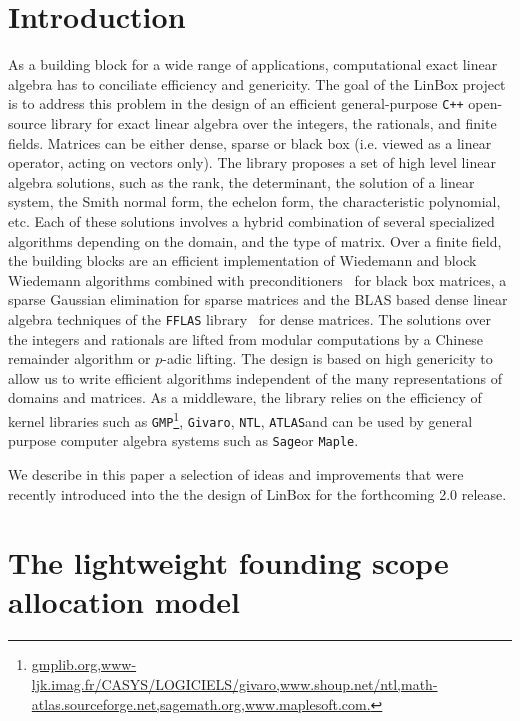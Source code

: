 \documentclass{article}
\newcommand{\linbox}{{\sc LinBox}\xspace}
\begin{document}
\section{Introduction}
As a building block for a wide range of applications, computational
exact linear algebra has to conciliate efficiency and genericity. The
goal of the \linbox project is to address this problem in the design
of an efficient general-purpose \texttt{C++} open-source library for
exact linear algebra over the integers, the rationals, and finite
fields.
Matrices can be either dense, sparse or black box (i.e. viewed as a linear
operator, acting on vectors only). The library proposes a set of high level
linear algebra solutions, such as the rank, the determinant, the solution of a
linear system, the Smith normal form, the echelon form, the characteristic
polynomial, etc. Each of these solutions involves a hybrid combination
of several specialized 
algorithms depending on the domain, and the type of matrix. Over a
finite field, 
the building blocks are an efficient implementation of Wiedemann and block
Wiedemann algorithms combined with preconditioners~\cite{CEKSTV:2002:EP} for
black box matrices, a sparse Gaussian elimination for sparse matrices and the
BLAS based dense linear algebra techniques of the \texttt{FFLAS}
library~\cite{DGP:2008:dlaff} for dense matrices. The solutions over
the integers 
and rationals are lifted from modular computations by a Chinese remainder
algorithm or $p$-adic lifting.
The design is based on high genericity to allow us to write efficient algorithms independent of the many 
representations of domains and matrices. As a middleware, the library relies on the
efficiency of kernel libraries such as  \texttt{GMP}\footnote{\url{gmplib.org,www-ljk.imag.fr/CASYS/LOGICIELS/givaro,www.shoup.net/ntl,math-atlas.sourceforge.net,sagemath.org,www.maplesoft.com.}},
\texttt{Givaro}\footnotemark[4],
\texttt{NTL}\footnotemark[4],
\texttt{ATLAS}\footnotemark[4] and can be used by general
purpose computer algebra systems such as \texttt{Sage}\footnotemark[4] or \texttt{Maple}\footnotemark[4].

We describe in this paper a selection of ideas and
improvements that were recently introduced into the the design of \linbox
for the forthcoming 2.0 release.

\section{The lightweight founding scope allocation model}
\end{document}
